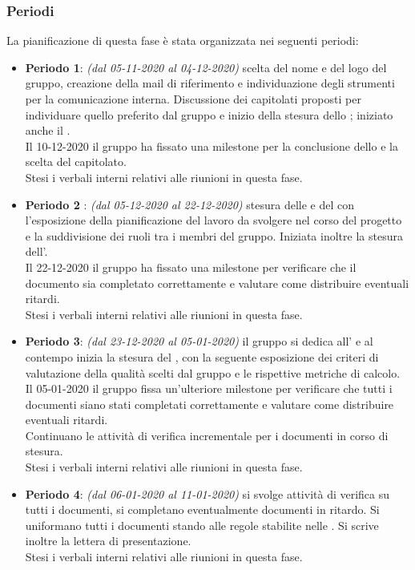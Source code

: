 \subsubsection{Periodi}
La pianificazione di questa fase è stata organizzata nei seguenti periodi:
\begin{itemize}
\item \textbf{Periodo 1}: \textit{(dal 05-11-2020 al 04-12-2020)} scelta del nome e del logo del gruppo, creazione della mail di riferimento e individuazione degli strumenti per la comunicazione interna. Discussione dei capitolati proposti per individuare quello preferito dal gruppo e inizio della stesura dello \textit{\SdF{}}; iniziato anche il \Glossario. \\Il 10-12-2020 il gruppo ha fissato una milestone\glo{} per la conclusione dello \textit{\SdF{}} e la scelta del capitolato.\\Stesi i verbali interni relativi alle riunioni in questa fase.
\item \textbf{Periodo 2 }: \textit{(dal 05-12-2020 al 22-12-2020)} stesura delle \textit{\NdP{}} e del \textit{\PdP{}} con l'esposizione della pianificazione del lavoro da svolgere nel corso del progetto e la suddivisione dei ruoli tra i membri del gruppo. Iniziata inoltre la stesura dell'\textit{\AdR{}}.\\Il 22-12-2020 il gruppo ha fissato una milestone per verificare che il documento \textit{\NdP{}} sia completato correttamente e valutare come distribuire eventuali ritardi.\\Stesi i verbali interni relativi alle riunioni in questa fase.
\item \textbf{Periodo 3}: \textit{(dal 23-12-2020 al 05-01-2020)} il gruppo si dedica all'\textit{\AdR{}} e al contempo inizia la stesura del \textit{\PdQ{}}, con la seguente esposizione dei criteri di valutazione della qualità scelti dal gruppo e le rispettive metriche\glo{} di calcolo.\\Il 05-01-2020 il gruppo fissa un'ulteriore milestone per verificare che tutti i documenti siano stati completati correttamente e valutare come distribuire eventuali ritardi.\\Continuano le attività di verifica incrementale per i documenti in corso di stesura.\\Stesi i verbali interni relativi alle riunioni in questa fase.
\item \textbf{Periodo 4}: \textit{(dal 06-01-2020 al 11-01-2020)} si svolge attività di verifica su tutti i documenti, si completano eventualmente documenti in ritardo. Si uniformano tutti i documenti stando alle regole stabilite nelle \textit{\NdP{}}. Si scrive inoltre la lettera di presentazione.\\Stesi i verbali interni relativi alle riunioni in questa fase.
\end{itemize}

